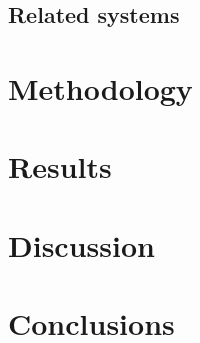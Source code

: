 \documentclass[english,twoside,openright]{HYgraduMLDS}
\begin{document}
\section{Related systems}
\label{sec:related-systems}


\chapter{Methodology}
\label{ch:methodology}


\chapter{Results}
\label{ch:results}


\chapter{Discussion}
\label{ch:discussion}


\chapter{Conclusions}
\label{ch:conclusions}

 

\cleardoublepage %



\begin{appendices}
\myappendixtitle



\end{appendices}
\end{document}
